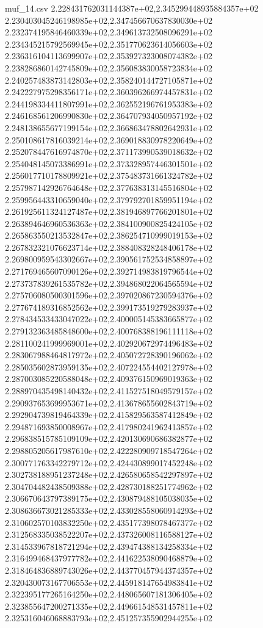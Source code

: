 \begin{filecontents*}{muf_14.csv}
2.228431762031144387e+02,2.345299448935884357e+02
2.230403045246198985e+02,2.347456670637830030e+02
2.232374195846460339e+02,2.349613732508096291e+02
2.234345215792569945e+02,2.351770623614056603e+02
2.236316104113699907e+02,2.353927323008074382e+02
2.238286860142745809e+02,2.356083830058723834e+02
2.240257483873142803e+02,2.358240144727105871e+02
2.242227975298356171e+02,2.360396266974457831e+02
2.244198334411807991e+02,2.362552196761953383e+02
2.246168561206990830e+02,2.364707934050957192e+02
2.248138655677199154e+02,2.366863478802642931e+02
2.250108617816039214e+02,2.369018830978220649e+02
2.252078447616974870e+02,2.371173990539018632e+02
2.254048145073386991e+02,2.373328957446301501e+02
2.256017710178809921e+02,2.375483731661324782e+02
2.257987142926764648e+02,2.377638313145516804e+02
2.259956443310659040e+02,2.379792701859951194e+02
2.261925611324127487e+02,2.381946897766201801e+02
2.263894646960536363e+02,2.384100900825424105e+02
2.265863550213532847e+02,2.386254710999019153e+02
2.267832321076623714e+02,2.388408328248406178e+02
2.269800959543302667e+02,2.390561752534858897e+02
2.271769465607090126e+02,2.392714983819796544e+02
2.273737839261535782e+02,2.394868022064565594e+02
2.275706080500301596e+02,2.397020867230594376e+02
2.277674189316852562e+02,2.399173519279283937e+02
2.278434533433047022e+02,2.400005145383665877e+02
2.279132363485848600e+02,2.400768388196111118e+02
2.281100241999969001e+02,2.402920672974496483e+02
2.283067988464817972e+02,2.405072728390196062e+02
2.285035602873959135e+02,2.407224554402127978e+02
2.287003085220588048e+02,2.409376150969019363e+02
2.288970435498140432e+02,2.411527518049579157e+02
2.290937653699953671e+02,2.413678655602843719e+02
2.292904739819464339e+02,2.415829563587412849e+02
2.294871693850008967e+02,2.417980241962413857e+02
2.296838515785109109e+02,2.420130690686382877e+02
2.298805205617987610e+02,2.422280909718547264e+02
2.300771763342279712e+02,2.424430899017452248e+02
2.302738188951237248e+02,2.426580658542297897e+02
2.304704482438509388e+02,2.428730188251774962e+02
2.306670643797389175e+02,2.430879488105038035e+02
2.308636673021285333e+02,2.433028558060914293e+02
2.310602570103832250e+02,2.435177398078467377e+02
2.312568335038522207e+02,2.437326008116588127e+02
2.314533967818721294e+02,2.439474388134258334e+02
2.316499468437977782e+02,2.441622538090468879e+02
2.318464836889743026e+02,2.443770457944374357e+02
2.320430073167706553e+02,2.445918147654983841e+02
2.322395177265164250e+02,2.448065607181306405e+02
2.323855647200271335e+02,2.449661548531457811e+02
2.325316046068883793e+02,2.451257355902944255e+02

\end{filecontents*}
